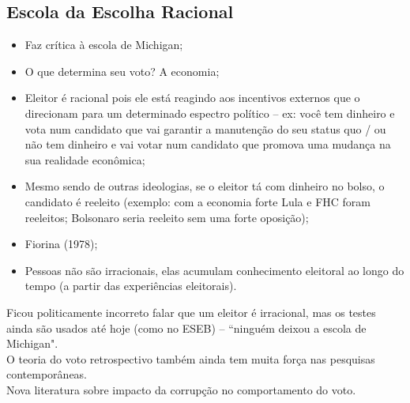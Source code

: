 \subsection{Escola da Escolha Racional}
\begin{itemize}
    \item Faz crítica à escola de Michigan;
    \item O que determina seu voto? A economia;
    \item Eleitor é racional pois ele está reagindo aos incentivos externos que o direcionam para um determinado espectro político – ex: você tem dinheiro e vota num candidato que vai garantir a manutenção do seu status quo / ou não tem dinheiro e vai votar num candidato que promova uma mudança na sua realidade econômica;
    \item Mesmo sendo de outras ideologias, se o eleitor tá com dinheiro no bolso, o candidato é reeleito (exemplo: com a economia forte Lula e FHC foram reeleitos; Bolsonaro seria reeleito sem uma forte oposição);
    \item Fiorina (1978);
    \item Pessoas não são irracionais, elas acumulam conhecimento eleitoral ao longo do tempo (a partir das experiências eleitorais).
\end{itemize}

\noindent Ficou politicamente incorreto falar que um eleitor é irracional, mas os testes ainda são usados até hoje (como no ESEB) – ``ninguém deixou a escola de Michigan". \\

\noindent O teoria do voto retrospectivo também ainda tem muita força nas pesquisas contemporâneas. \\

\noindent Nova literatura sobre impacto da corrupção no comportamento do voto.